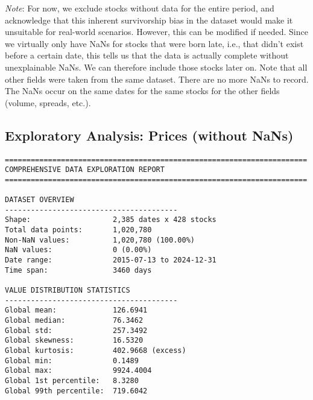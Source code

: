 \documentclass[11pt, letterpaper]{article}
\begin{document}
\textit{Note}: For now, we exclude stocks without data for the entire period, and acknowledge that this inherent survivorship bias in the dataset would make it unsuitable for real-world scenarios. However, this can be modified if needed. Since we virtually only have NaNs for stocks that were born late, i.e., that didn't exist before a certain date, this tells us that the data is actually complete without unexplainable NaNs. We can therefore include those stocks later on. Note that all other fields were taken from the same dataset. There are no more NaNs to record. The NaNs occur on the same dates for the same stocks for the other fields (volume, spreads, etc.).

\clearpage

\subsection{Exploratory Analysis: Prices (without NaNs)}
\begin{verbatim}
======================================================================
COMPREHENSIVE DATA EXPLORATION REPORT
======================================================================

DATASET OVERVIEW
----------------------------------------
Shape:                   2,385 dates x 428 stocks
Total data points:       1,020,780
Non-NaN values:          1,020,780 (100.00%)
NaN values:              0 (0.00%)
Date range:              2015-07-13 to 2024-12-31
Time span:               3460 days

VALUE DISTRIBUTION STATISTICS
----------------------------------------
Global mean:             126.6941
Global median:           76.3462
Global std:              257.3492
Global skewness:         16.5320
Global kurtosis:         402.9668 (excess)
Global min:              0.1489
Global max:              9924.4004
Global 1st percentile:   8.3280
Global 99th percentile:  719.6042
\end{verbatim}
\end{document}

